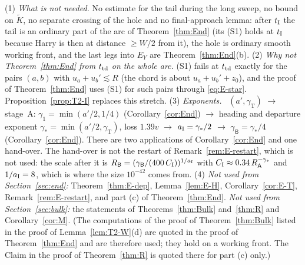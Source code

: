 \begin{remark}\label{rem:T2-budget}
(1) \emph{What is not needed.} No estimate for the tail during the long sweep, no bound on $\tilde K$, no separate crossing of the
hole and no final-approach lemma: after $t_{\mathrm I}$ the tail is an ordinary part of the arc of Theorem~\ref{thm:End} (its (S1) holds at
$t_{\mathrm I}$ because Harry is then at distance $\ge W/2$ from it), the hole is ordinary smooth working front, and the last legs into
$E_Y$ are Theorem~\ref{thm:End}(b).
(2) \emph{Why not Theorem~\ref{thm:End} from $t_{\mathrm{td}}$ on the whole arc.} (S1) fails at $t_{\mathrm{td}}$ exactly for the pairs $(a,b)$ with
$u_a+u_b'\lesssim R$ (the chord is about $u_a+u_b'+z_0$), and the proof of Theorem~\ref{thm:End} uses (S1) for such pairs through
\eqref{eq:E-star}. Proposition~\ref{prop:T2-I} replaces this stretch.
(3) \emph{Exponents.} \MHT\ $(a',\gamma_{\mathrm T})$ $\to$ stage~A: $\gamma_1=\min(a'/2,1/4)$ (Corollary~\ref{cor:End}) $\to$
heading and departure exponent $\gamma_*=\min(a'/2,\gamma_{\mathrm T})$, loss $1.39v$ $\to$ $a_{\mathrm I}=\gamma_*/2$ $\to$
$\gamma_{\mathsf B}=\gamma_*/4$ (Corollary~\ref{cor:End}). There are two applications of Corollary~\ref{cor:End} and one hand-over.
The hand-over is not the restart of Remark~\ref{rem:E-restart}, which is not used: the scale after it is
$R_{\mathsf B}=(\gamma_{\mathsf B}/(400\,C_{\mathrm I}))^{1/a_{\mathrm I}}$ with $C_{\mathrm I}\approx0.34\,R_{\mathsf A}^{-\gamma_*}$ and $1/a_{\mathrm I}=8$, which is
where the size $10^{-42}$ comes from.
(4) \emph{Not used from Section~\ref{sec:end}:} Theorem~\ref{thm:E-dep}, Lemma~\ref{lem:E-H}, Corollary~\ref{cor:E-T},
Remark~\ref{rem:E-restart}, and part (c) of Theorem~\ref{thm:End}. \emph{Not used from Section~\ref{sec:bulk}:}
the statements of Theorems~\ref{thm:Bulk} and~\ref{thm:R} and Corollary~\ref{cor:M}. (The computations of the proof of
Theorem~\ref{thm:Bulk} listed in the proof of Lemma~\ref{lem:T2-W}(d) are quoted in the proof of Theorem~\ref{thm:End} and are
therefore used; they hold on a working front. The Claim in the proof of Theorem~\ref{thm:R} is quoted there for part (c) only.)
\end{remark}

